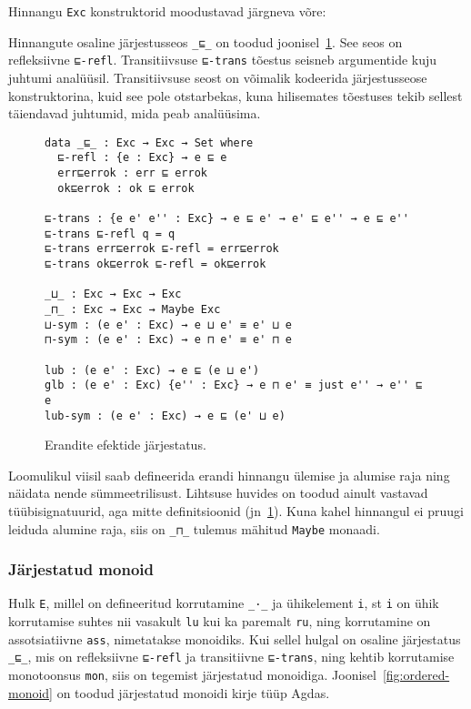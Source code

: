 \documentclass[a4paper,12pt]{article}
\begin{document}
Hinnangu {\tt Exc} konstruktorid moodustavad järgneva võre:
\begin{center}
\end{center}
Hinnangute osaline järjestusseos {\tt _⊑_} on toodud joonisel~\ref{fig:exc.ord}.
See seos on refleksiivne {\tt ⊑-refl}.
Transitiivsuse {\tt ⊑-trans} tõestus seisneb argumentide kuju juhtumi analüüsil.
Transitiivsuse seost on võimalik kodeerida järjestusseose konstruktorina, kuid see pole otstarbekas,
kuna hilisemates tõestuses tekib sellest täiendavad juhtumid, mida peab analüüsima.

\begin{figure}
  \begin{BVerbatim}
data _⊑_ : Exc → Exc → Set where
  ⊑-refl : {e : Exc} → e ⊑ e
  err⊑errok : err ⊑ errok
  ok⊑errok : ok ⊑ errok
  
⊑-trans : {e e' e'' : Exc} → e ⊑ e' → e' ⊑ e'' → e ⊑ e''
⊑-trans ⊑-refl q = q
⊑-trans err⊑errok ⊑-refl = err⊑errok
⊑-trans ok⊑errok ⊑-refl = ok⊑errok

_⊔_ : Exc → Exc → Exc
_⊓_ : Exc → Exc → Maybe Exc
⊔-sym : (e e' : Exc) → e ⊔ e' ≡ e' ⊔ e
⊓-sym : (e e' : Exc) → e ⊓ e' ≡ e' ⊓ e

lub : (e e' : Exc) → e ⊑ (e ⊔ e')
glb : (e e' : Exc) {e'' : Exc} → e ⊓ e' ≡ just e'' → e'' ⊑ e
lub-sym : (e e' : Exc) → e ⊑ (e' ⊔ e)
  \end{BVerbatim}
  \caption{Erandite efektide järjestatus.}
  \label{fig:exc.ord}
\end{figure}
Loomulikul viisil saab defineerida erandi hinnangu ülemise ja alumise raja ning näidata nende sümmeetrilisust.
Lihtsuse huvides on toodud ainult vastavad tüübisignatuurid, aga mitte definitsioonid (jn~\ref{fig:exc.ord}).
Kuna kahel hinnangul ei pruugi leiduda alumine raja, siis on {\tt _⊓_} tulemus mähitud {\tt Maybe} monaadi.

\subsubsection{Järjestatud monoid}
Hulk {\tt E}, millel on defineeritud korrutamine {\tt _·_} ja ühikelement {\tt i},
st {\tt i} on ühik korrutamise suhtes nii vasakult {\tt lu} kui ka paremalt {\tt ru},
ning korrutamine on assotsiatiivne {\tt ass}, nimetatakse monoidiks.
Kui sellel hulgal on osaline järjestatus {\tt _⊑_},
mis on refleksiivne {\tt ⊑-refl} ja transitiivne {\tt ⊑-trans},
ning kehtib korrutamise monotoonsus {\tt mon},
siis on tegemist järjestatud monoidiga.
Joonisel~\ref{fig:ordered-monoid} on toodud järjestatud monoidi kirje tüüp Agdas.
\end{document}
